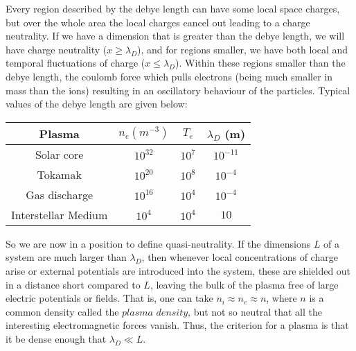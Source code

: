 Every region described by the debye length can have some local space charges, but over the whole area the local charges cancel out leading to a charge neutrality.
If we have a dimension that is greater than the debye length, we will have charge neutrality ($x \geq \lambda_D$), and for regions smaller, we have both local and temporal fluctuations of charge ($x\leq \lambda_D$).
Within these regions smaller than the debye length, the coulomb force which pulls electrons (being much smaller in mass than the ions) resulting in an oscillatory behaviour of the particles.
Typical values of the debye length are given below:
\begin{center}
\begin{tabular} { |c |c|c|c|}
	\hline
	Plasma & $n_e (m^{-3})$ & $T_e$ & $\lambda_D$  (m) \\
	\hline
	Solar core & $10^{32}$ & $10^7$ &  $10^{-11}$ \\
	\hline
	Tokamak & $10^{20}$ & $10^8$ & $10^{-4}$ \\
	\hline
	Gas discharge & $10^{16}$ & $10^4$ & $10^{-4}$ \\
	\hline
	Interstellar Medium & $10^{4}$ & $10^4$ & $10$ \\
	\hline
\end{tabular}
\end{center}
So we are now in a position to define quasi-neutrality.
If the dimensions $L$ of a system are much larger than $\lambda_D$, then whenever local concentrations of charge arise or external potentials are introduced into the system, these are shielded out in a distance short compared to $L$, leaving the bulk of the plasma free of large electric potentials or fields.
That is, one can take $n_i \approx n_e \approx n$, where $n$ is a common density called the $\textit{plasma density}$, but not so neutral that all the interesting electromagnetic forces vanish.
Thus, the criterion for a plasma is that it be dense enough that $\lambda_D \ll L$.

